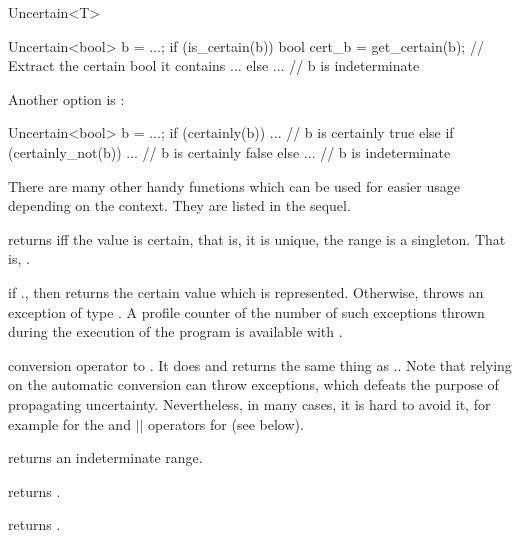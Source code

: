 \begin{ccRefClass}{Uncertain<T>}
\begin{ccExampleCode}
  Uncertain<bool> b = ...;
  if (is_certain(b))
    bool cert_b = get_certain(b); // Extract the certain bool it contains
    ...
  else
    ... // b is indeterminate
\end{ccExampleCode}

Another option is :

\begin{ccExampleCode}
  Uncertain<bool> b = ...;
  if (certainly(b))
    ... // b is certainly true
  else if (certainly_not(b))
    ... // b is certainly false
  else
    ... // b is indeterminate
\end{ccExampleCode}

  There are many other handy functions which can be used for easier usage depending
  on the context.  They are listed in the sequel.

  {returns  iff the value is certain, that is, it is unique, the range
   is a singleton. That is, .}

  {if \ccVar., then returns the certain value which is represented.
   Otherwise, throws an exception of type .
   A profile counter of the number of such exceptions thrown during the execution of
   the program is available with .}

  {conversion operator to .  It does and returns the same thing as
   \ccVar..  Note that relying on the automatic conversion
   can throw exceptions, which defeats the purpose of propagating uncertainty.
   Nevertheless, in many cases, it is hard to avoid it, for example for the
   \ccc{&&} and $||$ operators for  (see below).}


  \def\ccTagRmEigenClassName{\ccFalse}
  {returns an indeterminate range.}


  {returns .}

  {returns .}


\end{ccRefClass}
